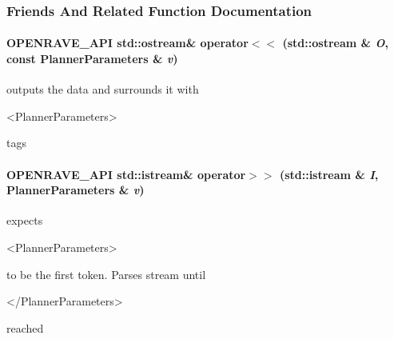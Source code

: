 \subsubsection{Friends And Related Function Documentation}
\hypertarget{classOpenRAVE_1_1PlannerBase_1_1PlannerParameters_a3a2efece353b49fc6235ec2ded1a7c9f}{
\paragraph[{operator$<$$<$}]{\setlength{\rightskip}{0pt plus 5cm}OPENRAVE\_\-API std::ostream\& operator$<$$<$ (std::ostream \& {\em O}, \/  const {\bf PlannerParameters} \& {\em v})}\hfill}
\label{classOpenRAVE_1_1PlannerBase_1_1PlannerParameters_a3a2efece353b49fc6235ec2ded1a7c9f}


outputs the data and surrounds it with 

\begin{DoxyVerb}<PlannerParameters> \end{DoxyVerb}
 tags \hypertarget{classOpenRAVE_1_1PlannerBase_1_1PlannerParameters_ac5b28f01c1ef45850c2fd44be0b12aea}{
\paragraph[{operator$>$$>$}]{\setlength{\rightskip}{0pt plus 5cm}OPENRAVE\_\-API std::istream\& operator$>$$>$ (std::istream \& {\em I}, \/  {\bf PlannerParameters} \& {\em v})}\hfill}
\label{classOpenRAVE_1_1PlannerBase_1_1PlannerParameters_ac5b28f01c1ef45850c2fd44be0b12aea}


expects 

\begin{DoxyVerb}<PlannerParameters> \end{DoxyVerb}
 to be the first token. Parses stream until \begin{DoxyVerb}</PlannerParameters> \end{DoxyVerb}
 reached 

